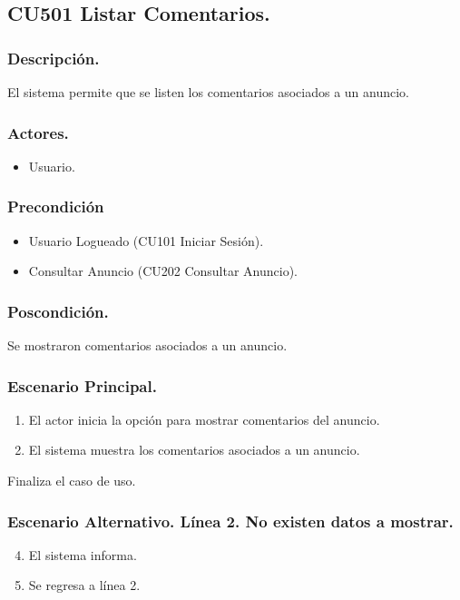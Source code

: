 \subsection{CU501 Listar Comentarios.}
\subsubsection{Descripci\'{o}n.}
El sistema permite que se listen los comentarios asociados a un anuncio.
\subsubsection{Actores.}
\begin{itemize}
\item Usuario.
\end{itemize}
\subsubsection{Precondici\'{o}n}
\begin{itemize}
\item Usuario Logueado (CU101 Iniciar Sesi\'{o}n).
\item Consultar Anuncio (CU202 Consultar Anuncio).
\end{itemize}
\subsubsection{Poscondici\'{o}n.}
Se mostraron comentarios asociados a un anuncio.
\subsubsection{Escenario Principal.}
\begin{enumerate}
\item El actor inicia la opci\'{o}n para mostrar comentarios del anuncio.
\item El sistema muestra los comentarios asociados a un anuncio.
\end{enumerate}
Finaliza el caso de uso.
\subsubsection{Escenario Alternativo. L\'{i}nea 2. No existen datos a mostrar.}
\begin{enumerate}
\setcounter{enumi}{3}
\item El sistema informa.
\item Se regresa a l\'{i}nea 2.
\end{enumerate}
